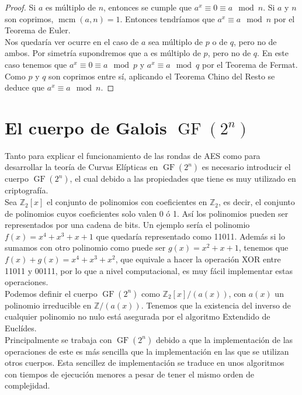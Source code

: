 	\begin{proof}
		Si $a$ es múltiplo de $n$, entonces se cumple que $a^x \equiv 0 \equiv a \mod n$. Si $a$ y $n$ son coprimos, $\operatorname{mcm}(a,n) = 1$. Entonces tendríamos que $a^x \equiv a \mod n$ por el Teorema de Euler.\\
		Nos quedaría ver ocurre en el caso de $a$ sea múltiplo de $p$ o de $q$, pero no de ambos. Por simetría supondremos que a es múltiplo de $p$, pero no de $q$. En este caso tenemos que $a^x \equiv 0 \equiv a \mod p$  y $a^x \equiv a \mod q$ por el Teorema de Fermat. Como $p$ y $q$ son coprimos entre sí, aplicando el Teorema Chino del Resto se deduce que $a^x \equiv a \mod n$.\qedhere
	\end{proof}

\section{El cuerpo de Galois $\operatorname{GF}(2^n)$}
Tanto para explicar el funcionamiento de las rondas de AES como para desarrollar la teoría de Curvas Elípticas en $\operatorname{GF}(2^n)$ es necesario introducir el cuerpo $\operatorname{GF}(2^n)$, el cual debido a las propiedades que tiene es muy utilizado en criptografía.\\
Sea $\mathbb{Z}_2[x]$ el conjunto de polinomios con coeficientes en $\mathbb{Z}_2$, es decir, el conjunto de polinomios cuyos coeficientes solo valen 0 ó 1. Así los polinomios pueden ser representados por una cadena de bits.
 Un ejemplo sería el polinomio $f(x)=x^4+x^3+x+1$ que quedaría representado como 11011. 
Además si lo sumamos con otro polinomio como puede ser $g(x)=x^2+x+1$, tenemos que $f(x)+g(x)=x^4+x^3+x^2$, que equivale a hacer la operación XOR entre 11011 y 00111, por lo que a nivel computacional, es muy fácil implementar estas operaciones.\\
Podemos definir el cuerpo $\operatorname{GF}(2^n)$ como $\mathbb{Z}_2[x]/(a(x))$, con $a(x)$ un polinomio irreducible en $\mathbb{Z}/(a(x))$. Tenemos que la existencia del inverso de cualquier polinomio no nulo está asegurada por el algoritmo Extendido de Euclídes.\\ 
Principalmente se trabaja con $\operatorname{GF}(2^n)$ debido a que la implementación de las operaciones de este es más sencilla que la implementación en las que se utilizan otros cuerpos. Esta sencillez de implementación se traduce en unos algoritmos con tiempos de ejecución menores a pesar de tener el mismo orden de complejidad.\\
